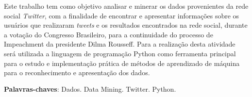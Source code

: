 \begin{resumo}[RESUMO]	
Este trabalho tem como objetivo analisar e minerar os dados provenientes da rede social \textit{Twitter}, com a finalidade de encontrar e apresentar informações sobre os usuários que realizaram \textit{tweets} e os resultados encontrados na rede social, durante a votação do Congresso Brasileiro, para a continuidade do processo de Impeachment da presidente Dilma Rousseff. Para a realização desta atividade será utilizada a linguagem de programação Python como ferramenta principal para o estudo e implementação prática de métodos de aprendizado de máquina para o reconhecimento e apresentação dos dados.


 \vspace{\onelineskip}
    
 \noindent
 \textbf{Palavras-chaves}: Dados. Data Mining. Twitter. Python.
\end{resumo}
